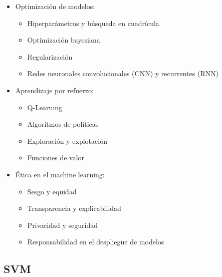 \documentclass[12pt]{article}
\begin{document}
\begin{itemize}
    \item Optimización de modelos:
        \begin{itemize}
            \item Hiperparámetros y búsqueda en cuadrícula
            \item Optimización bayesiana
            \item Regularización
            \item Redes neuronales convolucionales (CNN) y recurrentes (RNN)
        \end{itemize}
    \item Aprendizaje por refuerzo:
        \begin{itemize}
            \item Q-Learning
            \item Algoritmos de políticas
            \item Exploración y explotación
            \item Funciones de valor
        \end{itemize}
    \item Ética en el machine learning:
        \begin{itemize}
            \item Sesgo y equidad
            \item Transparencia y explicabilidad
            \item Privacidad y seguridad
            \item Responsabilidad en el despliegue de modelos
        \end{itemize}
\end{itemize}


\subsection{SVM}
\end{document}
